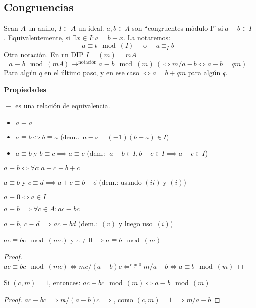 \subsection{Congruencias}
Sean $A$ un anillo, $I \subset A$ un ideal. $a,b \in A$ son ``congruentes módulo I'' si $a-b \in I$. Equivalentemente, si $\exists x \in I : a = b+x$. La notaremos:
\[
a \equiv b \mod(I) \quad \text{ o } \quad a \equiv_I b
\]
Otra notación. En un DIP $I = (m) = mA$
\[
a \equiv b \mod(mA) \to^{\text{notación}} a \equiv b \mod(m)\ (\iff m/a-b \iff a-b = qm)
\]
Para algún $q$ en el último paso, y en ese caso $\iff a = b+qm$ para algún $q$.

\textbf{Propiedades}

\begin{nlist}
	\item $\equiv$ es una relación de equivalencia.
	\begin{itemize}
		\item $a \equiv a$
		\item $a \equiv b \iff b \equiv a$ (dem.:\ $a-b = (-1)(b-a) \in I$)
		\item $a \equiv b$ y $b \equiv c \implies a \equiv c$ (dem.:\ $a-b\in I, b-c \in I \implies a-c \in I$)
	\end{itemize}

	\item $a\equiv b \iff \forall c : a+ c \equiv b + c$
	\item $a\equiv b$ y $c \equiv d \implies a+c \equiv b + d$ (dem.: usando $(ii)$ y $(i)$)
	\item $a \equiv 0 \iff a \in I$
	\item $a \equiv b \implies \forall c\in A : ac  \equiv bc$
	\item $a \equiv b$, $c \equiv d \implies ac \equiv bd$ (dem.:\ $(v)$ y luego uso\ $(i)$)
	\item $ac \equiv bc \mod(mc) $ y $c \ne 0 \implies a\equiv b \mod(m)$\\

\begin{proof}
	$ac \equiv bc \mod(mc) \iff mc/(a-b)c \iff^{c\ne 0} m/a-b \iff a\equiv b \mod(m)$
\end{proof}
	\item Si $(c,m) = 1$, entonces: $ac\equiv bc\mod(m) \iff a \equiv b\mod(m)$\\
	\begin{proof}
	$ac\equiv bc \implies m/(a-b)c \implies$, como $(c,m) = 1 \implies m/a-b$
\end{proof}


\end{nlist}

